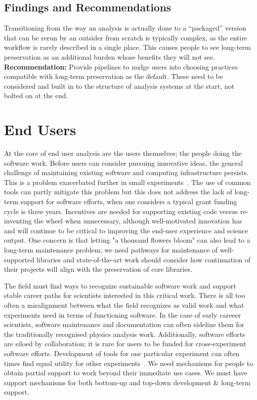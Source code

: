 \subsection{Findings and Recommendations}
Transitioning from the way an analysis is actually done to a “packaged” version that can be rerun by an outsider from scratch is typically complex, as the entire workflow is rarely described in a single place. This causes people to see long-term preservation as an additional burden whose benefits they will not see.\\
\textbf{Recommendation:} Provide pipelines to nudge users into choosing practices compatible with long-term preservation as the default. These need to be considered and built in to the structure of analysis systems at the start, not bolted on at the end.

\section{End Users}

At the core of end user analysis are the users themselves; the people doing the software work. Before users can consider pursuing innovative ideas, the general challenge of maintaining existing software and computing infrastructure persists. This is a problem exacerbated further in small experiments~\cite{arxiv.2203.07645}. The use of common tools can partly mitigate this problem but this does not address the lack of long-term support for software efforts, when one considers a typical grant funding cycle is three years. Incentives are needed for supporting existing code versus re-inventing the wheel when unnecessary, although well-motivated innovation has and will continue to be critical to improving the end-user experience and science output. One concern is that letting "a thousand flowers bloom" can also lead to a long-term maintenance problem; we need pathways for maintenance of well-supported libraries and state-of-the-art work should consider how continuation of their projects will align with the preservation of core libraries. 

The field must find ways to recognize sustainable software work and support stable career paths for scientists interested in this critical work. There is all too often a misalignment between what the field recognizes as valid work and what experiments need in terms of functioning software. In the case of early careeer scientists, software maintenance and documentation can often sideline them for the traditionally recognised physics analysis work. Additionally, software efforts are siloed by collaboration; it is rare for users to be funded for cross-experiment software efforts. Development of tools for one particular experiment can often times find equal utility for other experiments~\cite{arxiv.2203.13768}. We need mechanisms for people to obtain partial support to work beyond their immediate use cases. We must have support mechanisms for both bottom-up and top-down development \& long-term support.

